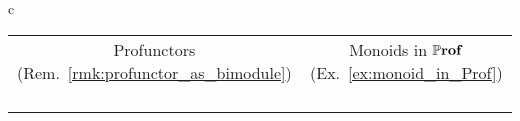\documentclass[11pt,oneside,article]{memoir}
\begin{document}
\begin{table}
  \centering
  \setlength{\extrarowheight}{3pt}
  \begin{tabular}{c}
    \toprule
    \begin{tabular}{@{\hspace{6pt}}cccc@{\hspace{6pt}}}
      \multicolumn{2}{c}{Profunctors (Rem.~\ref{rmk:profunctor_as_bimodule})}
      & \multicolumn{2}{c}{Monoids in $\mathbb{P}\mathbf{rof}$ (Ex.~\ref{ex:monoid_in_Prof})} \\
      \cmidrule[\lightrulewidth](r){1-2}\cmidrule[\lightrulewidth](l){3-4}
      \begin{tikzpicture}
        \matrix {
          \node [draw, circle] (f) {f}; \&[.2cm]
          \node [draw]         (m) {m}; \\
        };
        \begin{scope}[on background layer]
          \node[fit={(m)}] (back) {};
        \end{scope}
        \draw[ar] ($(f)-(1cm,0)$) to["c'"] (f);
        \draw[ar] (f) to["c"] (m.west);
        \draw[ar] (m) to["d"] +(1cm,0);
        \node [caption] {$m\cdot f$};
      \end{tikzpicture}
      &
      \begin{tikzpicture}
        \matrix {
          \node [draw]        (m) {m}; \&[.2cm]
          \node [draw,circle] (g) {g}; \\
        };
        \begin{scope}[on background layer]
          \node[fit={(m)}] (back) {};
        \end{scope}
        \draw[ar] ($(m)-(1cm,0)$) to["c"] (m);
        \draw[ar] (m) to["d"] (g);
        \draw[ar] (g) to["d'"] +(1cm,0);
        \node [caption] {$g\cdot m$};
      \end{tikzpicture}
      &
      \begin{tikzpicture}
        \matrix {
          \node [draw] (m1) {m_1}; \&
          \node [draw] (m2) {m_2}; \\
        };
        \begin{scope}[on background layer]
          \node[fit={(m1) (m2)}] (back) {};
        \end{scope}
        \draw[ar] ($(m1)-(1cm,0)$) to["c"] (m1);
        \draw[ar] (m1) to["d"] (m2);

\end{tikzpicture}
\end{tabular}
\end{tabular}
\end{table}
\end{document}
